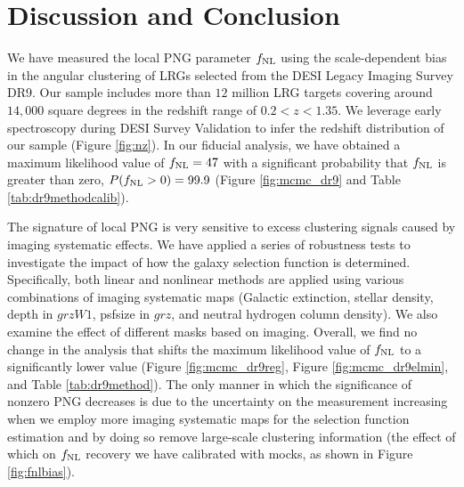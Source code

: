 \section{Discussion and Conclusion}\label{sec:conclusion}

We have measured the local PNG parameter $f_{\rm NL}$ using the scale-dependent bias in the angular clustering of LRGs selected from the DESI Legacy Imaging Survey DR9. Our sample includes more than $12$ million LRG targets covering around $14,000$ square degrees in the redshift range of $0.2< z < 1.35$. We leverage early spectroscopy during DESI Survey Validation \citep{desi2023sv} to infer the redshift distribution of our sample (Figure \ref{fig:nz}).  In our fiducial analysis, we have obtained a maximum likelihood value of $f_{\rm NL}=47$ with a significant probability that $f_{\rm NL}$ is greater than zero, $P(f_{\rm NL}>0)=99.9$ (Figure \ref{fig:mcmc_dr9} and Table \ref{tab:dr9methodcalib}). 

The signature of local PNG is very sensitive to excess clustering signals caused by imaging systematic effects. We have applied a series of robustness tests to investigate the impact of how the galaxy selection function is determined. Specifically, both linear and nonlinear methods are applied using various combinations of imaging systematic maps (Galactic extinction, stellar density, depth in $grzW1$, psfsize in $grz$, and neutral hydrogen column density). We also examine the effect of different masks based on imaging. Overall, we find no change in the analysis that shifts the maximum likelihood value of $f_{\rm NL}$ to a significantly lower value (Figure \ref{fig:mcmc_dr9reg}, Figure \ref{fig:mcmc_dr9elmin}, and Table \ref{tab:dr9method}). The only manner in which the significance of nonzero PNG decreases is due to the uncertainty on the measurement increasing when we employ more imaging systematic maps for the selection function estimation and by doing so remove large-scale clustering information (the effect of which on $f_{\rm NL}$ recovery we have calibrated with mocks, as shown in Figure \ref{fig:fnlbias}).


